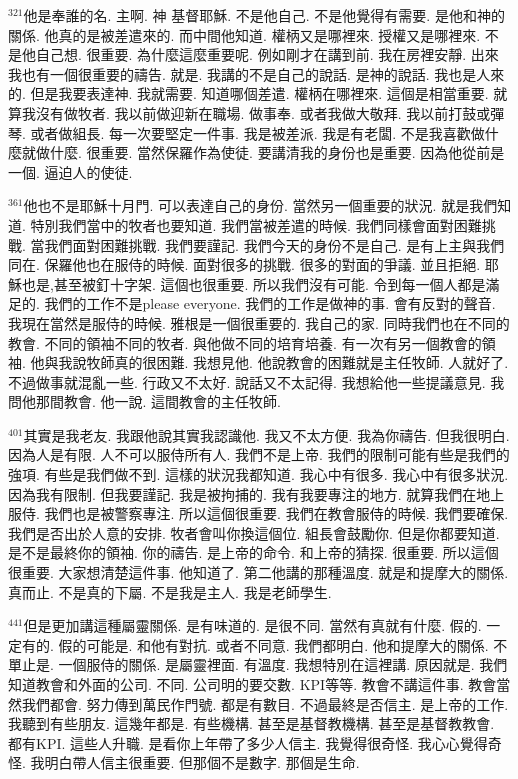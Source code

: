 \documentclass{book}
\begin{document}
$^{321}$他是奉誰的名.
主啊.
神 基督耶穌.
不是他自己.
不是他覺得有需要.
是他和神的關係.
他真的是被差遣來的.
而中間他知道.
權柄又是哪裡來.
授權又是哪裡來.
不是他自己想.
很重要.
為什麼這麼重要呢.
例如剛才在講到前.
我在房裡安靜.
出來我也有一個很重要的禱告.
就是.
我講的不是自己的說話.
是神的說話.
我也是人來的.
但是我要表達神.
我就需要.
知道哪個差遣.
權柄在哪裡來.
這個是相當重要.
就算我沒有做牧者.
我以前做迎新在職場.
做事奉.
或者我做大敬拜.
我以前打鼓或彈琴.
或者做組長.
每一次要堅定一件事.
我是被差派.
我是有老闆.
不是我喜歡做什麼就做什麼.
很重要.
當然保羅作為使徒.
要講清我的身份也是重要.
因為他從前是一個.
逼迫人的使徒.

$^{361}$他也不是耶穌十月門.
可以表達自己的身份.
當然另一個重要的狀況.
就是我們知道.
特別我們當中的牧者也要知道.
我們當被差遣的時候.
我們同樣會面對困難挑戰.
當我們面對困難挑戰.
我們要謹記.
我們今天的身份不是自己.
是有上主與我們同在.
保羅他也在服侍的時候.
面對很多的挑戰.
很多的對面的爭議.
並且拒絕.
耶穌也是,甚至被釘十字架.
這個也很重要.
所以我們沒有可能.
令到每一個人都是滿足的.
我們的工作不是please everyone.
我們的工作是做神的事.
會有反對的聲音.
我現在當然是服侍的時候.
雅根是一個很重要的.
我自己的家.
同時我們也在不同的教會.
不同的領袖不同的牧者.
與他做不同的培育培養.
有一次有另一個教會的領袖.
他與我說牧師真的很困難.
我想見他.
他說教會的困難就是主任牧師.
人就好了.
不過做事就混亂一些.
行政又不太好.
說話又不太記得.
我想給他一些提議意見.
我問他那間教會.
他一說.
這間教會的主任牧師.

$^{401}$其實是我老友.
我跟他說其實我認識他.
我又不太方便.
我為你禱告.
但我很明白.
因為人是有限.
人不可以服侍所有人.
我們不是上帝.
我們的限制可能有些是我們的強項.
有些是我們做不到.
這樣的狀況我都知道.
我心中有很多.
我心中有很多狀況.
因為我有限制.
但我要謹記.
我是被拘捕的.
我有我要專注的地方.
就算我們在地上服侍.
我們也是被警察專注.
所以這個很重要.
我們在教會服侍的時候.
我們要確保.
我們是否出於人意的安排.
牧者會叫你換這個位.
組長會鼓勵你.
但是你都要知道.
是不是最終你的領袖.
你的禱告.
是上帝的命令.
和上帝的猜探.
很重要.
所以這個很重要.
大家想清楚這件事.
他知道了.
第二他講的那種溫度.
就是和提摩大的關係.
真而止.
不是真的下屬.
不是我是主人.
我是老師學生.

$^{441}$但是更加講這種屬靈關係.
是有味道的.
是很不同.
當然有真就有什麼.
假的.
一定有的.
假的可能是.
和他有對抗.
或者不同意.
我們都明白.
他和提摩大的關係.
不單止是.
一個服侍的關係.
是屬靈裡面.
有溫度.
我想特別在這裡講.
原因就是.
我們知道教會和外面的公司.
不同.
公司明的要交數.
KPI等等.
教會不講這件事.
教會當然我們都會.
努力傳到萬民作門號.
都是有數目.
不過最終是否信主.
是上帝的工作.
我聽到有些朋友.
這幾年都是.
有些機構.
甚至是基督教機構.
甚至是基督教教會.
都有KPI.
這些人升職.
是看你上年帶了多少人信主.
我覺得很奇怪.
我心心覺得奇怪.
我明白帶人信主很重要.
但那個不是數字.
那個是生命.
\end{document}
